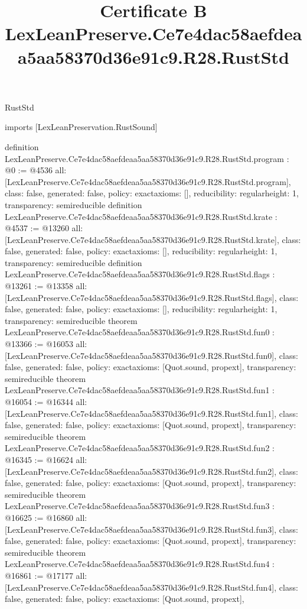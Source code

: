 \begin{lexlean}{RustStd}
\title{Certificate B LexLeanPreserve.Ce7e4dac58aefdeaa5aa58370d36e91c9.R28.RustStd}
\begin{coremodule}
imports [LexLeanPreservation.RustSound]

definition LexLeanPreserve.Ce7e4dac58aefdeaa5aa58370d36e91c9.R28.RustStd.program : @0 := @4536 {
  all: [LexLeanPreserve.Ce7e4dac58aefdeaa5aa58370d36e91c9.R28.RustStd.program],
  class: false,
  generated: false,
  policy: exact{axioms: []},
  reducibility: regular{height: 1},
  transparency: semireducible
}
definition LexLeanPreserve.Ce7e4dac58aefdeaa5aa58370d36e91c9.R28.RustStd.krate : @4537 := @13260 {
  all: [LexLeanPreserve.Ce7e4dac58aefdeaa5aa58370d36e91c9.R28.RustStd.krate],
  class: false,
  generated: false,
  policy: exact{axioms: []},
  reducibility: regular{height: 1},
  transparency: semireducible
}
definition LexLeanPreserve.Ce7e4dac58aefdeaa5aa58370d36e91c9.R28.RustStd.flags : @13261 := @13358 {
  all: [LexLeanPreserve.Ce7e4dac58aefdeaa5aa58370d36e91c9.R28.RustStd.flags],
  class: false,
  generated: false,
  policy: exact{axioms: []},
  reducibility: regular{height: 1},
  transparency: semireducible
}
theorem LexLeanPreserve.Ce7e4dac58aefdeaa5aa58370d36e91c9.R28.RustStd.fun0 : @13366 := @16053 {
  all: [LexLeanPreserve.Ce7e4dac58aefdeaa5aa58370d36e91c9.R28.RustStd.fun0],
  class: false,
  generated: false,
  policy: exact{axioms: [Quot.sound, propext]},
  transparency: semireducible
}
theorem LexLeanPreserve.Ce7e4dac58aefdeaa5aa58370d36e91c9.R28.RustStd.fun1 : @16054 := @16344 {
  all: [LexLeanPreserve.Ce7e4dac58aefdeaa5aa58370d36e91c9.R28.RustStd.fun1],
  class: false,
  generated: false,
  policy: exact{axioms: [Quot.sound, propext]},
  transparency: semireducible
}
theorem LexLeanPreserve.Ce7e4dac58aefdeaa5aa58370d36e91c9.R28.RustStd.fun2 : @16345 := @16624 {
  all: [LexLeanPreserve.Ce7e4dac58aefdeaa5aa58370d36e91c9.R28.RustStd.fun2],
  class: false,
  generated: false,
  policy: exact{axioms: [Quot.sound, propext]},
  transparency: semireducible
}
theorem LexLeanPreserve.Ce7e4dac58aefdeaa5aa58370d36e91c9.R28.RustStd.fun3 : @16625 := @16860 {
  all: [LexLeanPreserve.Ce7e4dac58aefdeaa5aa58370d36e91c9.R28.RustStd.fun3],
  class: false,
  generated: false,
  policy: exact{axioms: [Quot.sound, propext]},
  transparency: semireducible
}
theorem LexLeanPreserve.Ce7e4dac58aefdeaa5aa58370d36e91c9.R28.RustStd.fun4 : @16861 := @17177 {
  all: [LexLeanPreserve.Ce7e4dac58aefdeaa5aa58370d36e91c9.R28.RustStd.fun4],
  class: false,
  generated: false,
  policy: exact{axioms: [Quot.sound, propext]},
}
\end{coremodule}
\end{lexlean}
